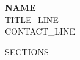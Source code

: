 \documentclass[10pt,a4paper]{ctexart}
\begin{document}
\begin{center}
{\LARGE \textbf{ {{NAME}} }}\\
\vspace{3pt}
{\small {{TITLE_LINE}} }\\
\vspace{3pt}
{\small {{CONTACT_LINE}} }
\end{center}

{{SECTIONS}}
\end{document}
